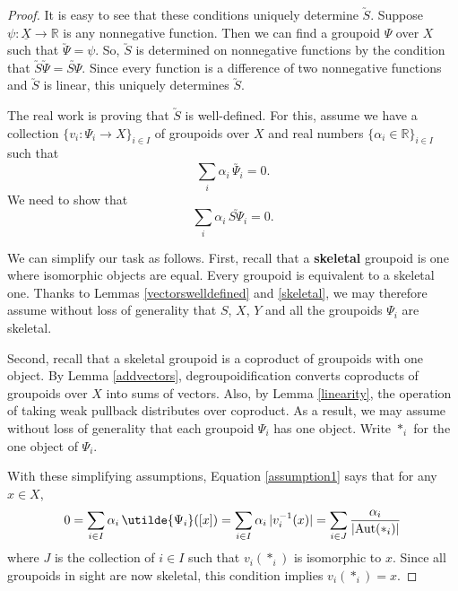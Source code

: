\documentclass{article}
\renewcommand{\to}{\rightarrow}
\newcommand{\maps}{\colon}
\newcommand{\R}{{\mathbb R}}
\newcommand{\Aut}{{\rm Aut}}
\renewcommand{\u}[1]{\underline{#1}}
\begin{document}
\begin{proof}
It is easy to see that these conditions uniquely determine
$\utilde{S}$.  Suppose $\psi \maps \u{X} \to \R$ is
any nonnegative function.  Then we can find a groupoid $\Psi$
over $X$ such that $\utilde{\Psi} = \psi$.  So, $\utilde{S}$
is determined on nonnegative functions by the condition that
$\utilde{S}\utilde{\Psi} = \utilde{S\Psi}$.  Since every
function is a difference of two nonnegative functions and 
$\utilde{S}$ is linear, this uniquely determines $\utilde{S}$.

The real work is proving that $\utilde{S}$ is well-defined.  
For this, assume we have a collection $\lbrace v_i \maps \Psi_i \to X
\rbrace_{i\in I}$ of groupoids over $X$ and real numbers $\lbrace
\alpha_i \in \R \rbrace_{i\in I}$ such that
\begin{equation}
\label{assumption1}
 \sum_i \alpha_i \, \utilde{\Psi_i} = 0. 
\end{equation}
We need to show that
\begin{equation}
\label{fact0}
 \sum_i\alpha_i \, \utilde{S\Psi_i} = 0.
\end{equation}

We can simplify our task as follows.  First, recall that a {\bf
skeletal} groupoid is one where isomorphic objects are equal.  Every
groupoid is equivalent to a skeletal one.  Thanks to Lemmas
\ref{vectorswelldefined} and \ref{skeletal}, we may therefore assume
without loss of generality that $S$, $X$, $Y$ and all the groupoids
$\Psi_i$ are skeletal.

Second, recall that a skeletal groupoid is a coproduct of groupoids
with one object.  By Lemma \ref{addvectors}, degroupoidification
converts coproducts of groupoids over $X$ into sums of vectors.  Also,
by Lemma \ref{linearity}, the operation of taking weak pullback
distributes over coproduct.  As a result, we may assume without loss
of generality that each groupoid $\Psi_i$ has one object.  Write
$\ast_i$ for the one object of $\Psi_i$.

With these simplifying assumptions, Equation \ref{assumption1} says
that for any $x \in X$,
\begin{equation}
\label{assumption2}
 0  =  \displaystyle{\sum_{i \in I} \alpha_i \, \utilde{\Psi_i}([x])} 
    =  \displaystyle{\sum_{i \in I} \alpha_i \, |v_i^{-1} (x)|}   
    = \displaystyle{\sum_{i \in J} \frac{\alpha_i}{|\Aut(\ast_i)|}}
\end{equation}
where $J$ is the collection of $i \in I$ such that $v_i(\ast_i)$ is
isomorphic to $x$.  Since all groupoids in sight
are now skeletal, this condition implies $v_i(\ast_i) = x$.


\end{proof}
\end{document}
